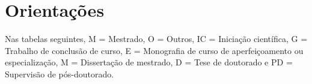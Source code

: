 \documentclass[12pt,brazil]{article}\usepackage[]{graphicx}\usepackage[]{xcolor}
\makeatletter
\newenvironment{kframe}{%
 \def\at@end@of@kframe{}%
 \ifinner\ifhmode%
  \def\at@end@of@kframe{\end{minipage}}%
  \begin{minipage}{\columnwidth}%
 \fi\fi%
 \def\FrameCommand##1{\hskip\@totalleftmargin \hskip-\fboxsep
 \colorbox{shadecolor}{##1}\hskip-\fboxsep
     \hskip-\linewidth \hskip-\@totalleftmargin \hskip\columnwidth}%
 \MakeFramed {\advance\hsize-\width
   \@totalleftmargin\z@ \linewidth\hsize
   \@setminipage}}%
 {\par\unskip\endMakeFramed%
 \at@end@of@kframe}
\newcounter{tabela}
\makeatother
\begin{document}
\begin{kframe}


{\ttfamily\noindent\bfseries{}}\end{kframe}

\newpage

\section{Orientações}

Nas tabelas seguintes,
M = Mestrado,
O = Outros,
IC = Iniciação científica,
G = Trabalho de conclusão de curso,
E = Monografia de curso de aperfeiçoamento ou especialização,
M = Dissertação de mestrado,
D = Tese de doutorado e
PD = Supervisão de pós-doutorado.
\end{document}
